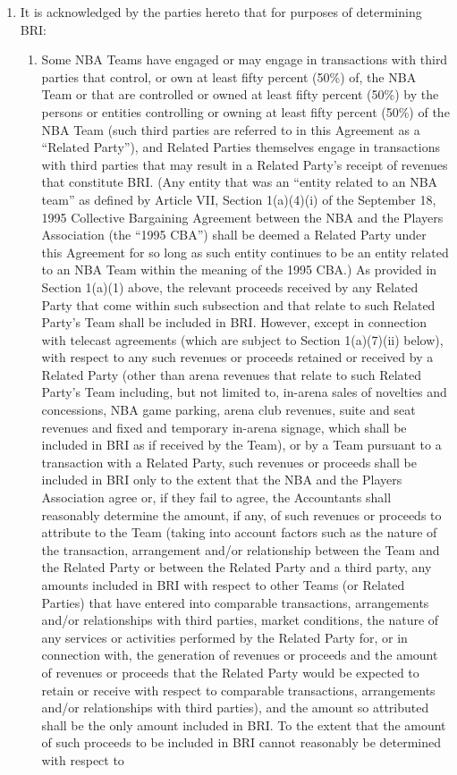 \documentclass[
]{book}
\providecommand{\tightlist}{%
  \setlength{\itemsep}{0pt}\setlength{\parskip}{0pt}}
\begin{document}
\begin{enumerate}
\begin{enumerate}
\begin{enumerate}
    \end{enumerate}
  \item
    It is acknowledged by the parties hereto that for purposes of determining BRI:

    \begin{enumerate}
    \def\labelenumiii{(\roman{enumiii})}
    \tightlist
    \item
      Some NBA Teams have engaged or may engage in transactions with third parties that control, or own at least fifty percent (50\%) of, the NBA Team or that are controlled or owned at least fifty percent (50\%) by the persons or entities controlling or owning at least fifty percent (50\%) of the NBA Team (such third parties are referred to in this Agreement as a ``Related Party''), and Related Parties themselves engage in transactions with third parties that may result in a Related Party's receipt of revenues that constitute BRI. (Any entity that was an ``entity related to an NBA team'' as defined by Article VII, Section 1(a)(4)(i) of the September 18, 1995 Collective Bargaining Agreement between the NBA and the Players Association (the ``1995 CBA'') shall be deemed a Related Party under this Agreement for so long as such entity continues to be an entity related to an NBA Team within the meaning of the 1995 CBA.) As provided in Section 1(a)(1) above, the relevant proceeds received by any Related Party that come within such subsection and that relate to such Related Party's Team shall be included in BRI. However, except in connection with telecast agreements (which are subject to Section 1(a)(7)(ii) below), with respect to any such revenues or proceeds retained or received by a Related Party (other than arena revenues that relate to such Related Party's Team including, but not limited to, in-arena sales of novelties and concessions, NBA game parking, arena club revenues, suite and seat revenues and fixed and temporary in-arena signage, which shall be included in BRI as if received by the Team), or by a Team pursuant to a transaction with a Related Party, such revenues or proceeds shall be included in BRI only to the extent that the NBA and the Players Association agree or, if they fail to agree, the Accountants shall reasonably determine the amount, if any, of such revenues or proceeds to attribute to the Team (taking into account factors such as the nature of the transaction, arrangement and/or relationship between the Team and the Related Party or between the Related Party and a third party, any amounts included in BRI with respect to other Teams (or Related Parties) that have entered into comparable transactions, arrangements and/or relationships with third parties, market conditions, the nature of any services or activities performed by the Related Party for, or in connection with, the generation of revenues or proceeds and the amount of revenues or proceeds that the Related Party would be expected to retain or receive with respect to comparable transactions, arrangements and/or relationships with third parties), and the amount so attributed shall be the only amount included in BRI. To the extent that the amount of such proceeds to be included in BRI cannot reasonably be determined with respect to 
\end{enumerate}
\end{enumerate}
\end{enumerate}
\end{document}
